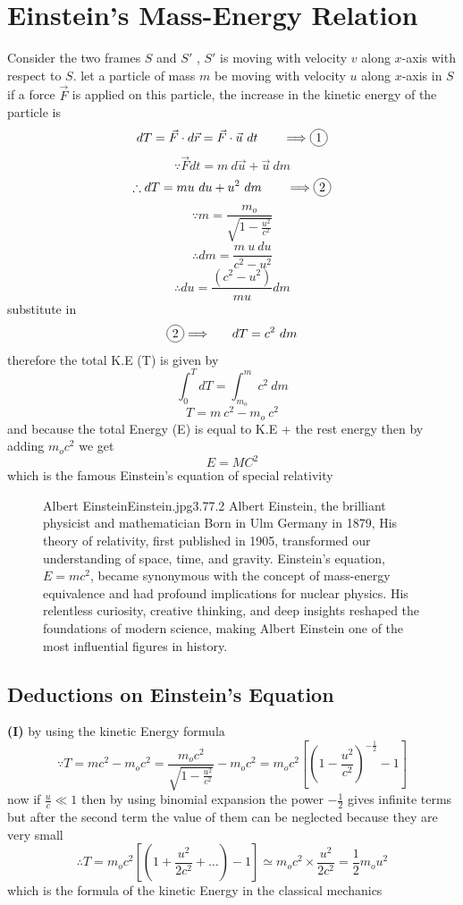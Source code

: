 \documentclass{article}
\begin{document}
\section{Einstein's Mass-Energy Relation}
Consider the two frames $S$ and $S'$ , $S'$ is moving with velocity $v$ along $x$-axis with respect to $S$.
let a particle of mass $m$ be moving with velocity $u$ along $x$-axis in $S$\\
if a force $\vec{F}$ is applied on this particle, the increase in the kinetic energy of the particle is 
\[
dT = \vec{F} \cdot d\vec{r} = \vec{F} \cdot \vec{u} \ dt \ \ \ \ \ \ \Longrightarrow \circled{1}
\]
\[
\because  \vec{F} dt = m \ d\vec{u} + \vec{u} \ dm
\]
\[
\therefore dT = mu \ du + u^2 \ dm    \ \ \ \ \ \ \Longrightarrow \circled{2}
\]
\[
\because m = \frac{m_o}{\sqrt{1 - \frac{u^2}{c^2}}} 
\]
\[
\therefore dm = \frac{m \ u \ du}{c^2 - u^2}
\]
\[
\therefore du = \frac{(c^2 - u^2)}{mu} dm
\]
substitute in 
\[
\circled{2}  \Longrightarrow \ \ \ \ \  dT = c^2 \ dm
\]
therefore the total K.E (T) is given by 
\[
\int_{0}^{T} dT = \int_{m_o}^{m} c^2 \ dm
\]
\[
T = m \ c^2 - m_o \ c^2
\]
and because the total Energy (E) is equal to K.E + the rest energy then by adding $m_o c^2$ we get 
\[
E = MC^2
\]
which is the famous Einstein's equation of special relativity
\begin{figure}[b]
    \begin{enrichment}{Albert Einstein}{Einstein.jpg}{3}{.77}{.2}
        Albert Einstein, the brilliant physicist and mathematician Born in Ulm Germany in 1879,
        His theory of relativity, first published in 1905, transformed our understanding of space, time, and gravity. 
        Einstein's equation, $E=mc^2$, became synonymous with the concept of mass-energy equivalence and had profound implications for nuclear physics.
        His relentless curiosity, creative thinking, and deep insights reshaped the foundations of modern science, making Albert Einstein one of the most influential figures in history.
    \end{enrichment}
\end{figure}
\subsection{Deductions on Einstein’s Equation}

\textbf{(I)} by using the kinetic Energy formula
\[
\because T = m c^2 - m_o c^2 = \frac{m_o c^2}{\sqrt{1 - \frac{u^2}{c^2}}}  - m_o c^2 = m_o c^2 \left[{\left(1- \frac{u^2}{c^2}\right)}^{-\frac{1}{2}}-1\right]
\]
now if $\frac{u}{c} \ll 1 $ then by using binomial expansion the power $-\frac{1}{2}$ gives infinite terms but after the second term the value of them can be neglected because they are very small  
\[
\therefore T = m_o c^2 \left[{\left(1+ \frac{u^2}{2c^2} + \dots \right)}-1\right] \simeq m_o c^2 \times \frac{u^2}{2c^2} = \frac{1}{2} m_o u^2
\]
which is the formula of the kinetic Energy in the classical mechanics\\
\end{document}
